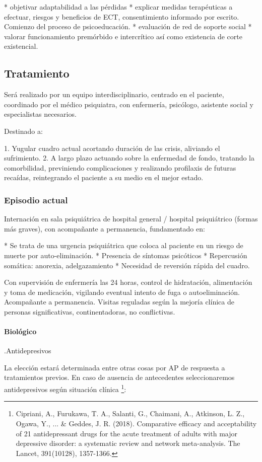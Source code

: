 \documentclass{scrbook}
\begin{document}
* objetivar adaptabilidad a las pérdidas
* explicar medidas terapéuticas a efectuar, riesgos y beneficios de ECT, consentimiento informado por escrito. Comienzo del proceso de psicoeducación.
* evaluación de red de soporte social
* valorar funcionamiento premórbido e intercrítico así como existencia de corte existencial.
\subsection*{Tratamiento}
Será realizado por un equipo interdisciplinario, centrado en el paciente, coordinado por el médico psiquiatra, con enfermería, psicólogo, asistente social y especialistas necesarios.

Destinado a:

1. Yugular cuadro actual acortando duración de las crisis, aliviando el sufrimiento.
2. A largo plazo actuando sobre la enfermedad de fondo, tratando la comorbilidad, previniendo complicaciones y realizando profilaxis de futuras recaídas, reintegrando el paciente a su medio en el mejor estado.
\subsubsection*{Episodio actual}
Internación en sala psiquiátrica de hospital general / hospital psiquiátrico (formas más graves), con acompañante a permanencia, fundamentado en:

* Se trata de una urgencia psiquiátrica que coloca al paciente en un riesgo de muerte por auto-eliminación.
* Presencia de síntomas psicóticos
* Repercusión somática: anorexia, adelgazamiento
* Necesidad de reversión rápida del cuadro.

Con supervisión de enfermería las 24 horas, control de hidratación, alimentación y toma de medicación, vigilando eventual intento de fuga o autoeliminación. Acompañante a permanencia. Visitas reguladas según la mejoría clínica de personas significativas, continentadoras, no conflictivas.
\paragraph{Biológico}

.Antidepresivos

La elección estará determinada entre otras cosas por AP de respuesta a tratamientos previos. En caso de ausencia de antecedentes seleccionaremos antidepresivos según situación clínica \footnote{Cipriani, A., Furukawa, T. A., Salanti, G., Chaimani, A., Atkinson, L. Z., Ogawa, Y., ... \& Geddes, J. R. (2018). Comparative efficacy and acceptability of 21 antidepressant drugs for the acute treatment of adults with major depressive disorder: a systematic review and network meta-analysis. The Lancet, 391(10128), 1357-1366.}:
\end{document}
